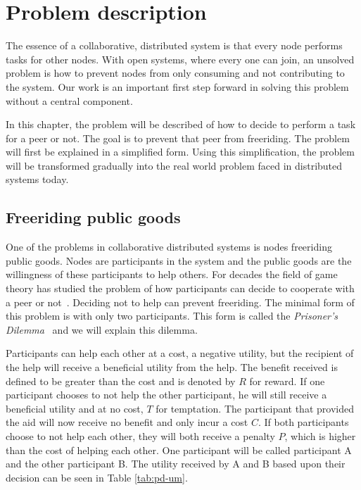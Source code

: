 \chapter{Problem description}
The essence of a collaborative, distributed system is that every node performs tasks for other nodes.
With open systems, where every one can join, an unsolved problem is how to prevent nodes
from only consuming and not contributing to the system.
Our work is an important first step forward in solving this problem without a central component.

In this chapter, the problem will be described of how to decide to perform a task for a peer or not.
The goal is to prevent that peer from freeriding.
The problem will first be explained in a simplified form.
Using this simplification, the problem will be transformed gradually
into the real world problem faced in distributed systems today.

\section{Freeriding public goods}
One of the problems in collaborative distributed systems is nodes freeriding public goods.
Nodes are participants in the system and the public goods are the willingness of these participants to help others.
For decades the field of game theory has studied the problem of how
participants can decide to cooperate with a peer or not~\cite{Hardin-Tragedy}.
Deciding not to help can prevent freeriding.
The minimal form of this problem is with only two participants.
This form is called the \emph{Prisoner's Dilemma}~\cite{Nowak-PrisonerDilemma,Lai-Incentives}
and we will explain this dilemma.

Participants can help each other at a cost, a negative utility,
but the recipient of the help will receive a beneficial utility from the help.
The benefit received is defined to be greater
than the cost and is denoted by $R$ for reward.
If one participant chooses to not help the other participant,
he will still receive a beneficial utility and at no cost, $T$ for temptation.
The participant that provided the aid will now receive no benefit and only incur a cost $C$.
If both participants choose to not help each other,
they will both receive a penalty $P$, which is higher than the cost of helping each other.
One participant will be called participant A and the other participant B.
The utility received by A and B based upon their decision can be seen in Table \ref{tab:pd-um}.

